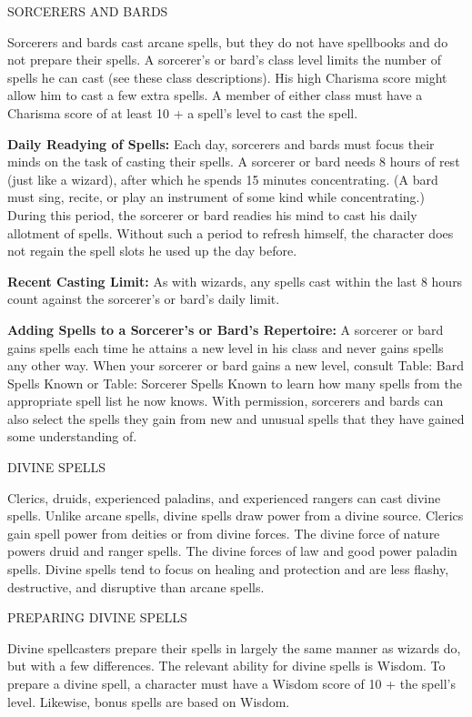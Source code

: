 \documentclass{article}
\begin{document}
\vspace{12pt}
SORCERERS AND BARDS

Sorcerers and bards cast arcane spells, but they do not have spellbooks and do 
not prepare their spells. A sorcerer's or bard's class level limits the number 
of spells he can cast (see these class descriptions). His high Charisma score might 
allow him to cast a few extra spells. A member of either class must have a Charisma 
score of at least 10 + a spell's level to cast the spell.

\textbf{Daily Readying of Spells:} Each day, sorcerers and bards must focus their 
minds on the task of casting their spells. A sorcerer or bard needs 8 hours of 
rest (just like a wizard), after which he spends 15 minutes concentrating. (A bard 
must sing, recite, or play an instrument of some kind while concentrating.) During 
this period, the sorcerer or bard readies his mind to cast his daily allotment 
of spells. Without such a period to refresh himself, the character does not regain 
the spell slots he used up the day before.

\textbf{Recent Casting Limit: }As with wizards, any spells cast within the last 
8 hours count against the sorcerer's or bard's daily limit.

\textbf{Adding Spells to a Sorcerer's or Bard's Repertoire:} A sorcerer or bard 
gains spells each time he attains a new level in his class and never gains spells 
any other way. When your sorcerer or bard gains a new level, consult Table: Bard 
Spells Known or Table: Sorcerer Spells Known to learn how many spells from the 
appropriate spell list he now knows. With permission, sorcerers and bards can also 
select the spells they gain from new and unusual spells that they have gained some 
understanding of.

\vspace{12pt}
{\LARGE{}DIVINE SPELLS}

Clerics, druids, experienced paladins, and experienced rangers can cast divine 
spells. Unlike arcane spells, divine spells draw power from a divine source. Clerics 
gain spell power from deities or from divine forces. The divine force of nature 
powers druid and ranger spells. The divine forces of law and good power paladin 
spells. Divine spells tend to focus on healing and protection and are less flashy, 
destructive, and disruptive than arcane spells.

\vspace{12pt}
PREPARING DIVINE SPELLS

Divine spellcasters prepare their spells in largely the same manner as wizards 
do, but with a few differences. The relevant ability for divine spells is Wisdom. 
To prepare a divine spell, a character must have a Wisdom score of 10 + the spell's 
level. Likewise, bonus spells are based on Wisdom.
\end{document}
